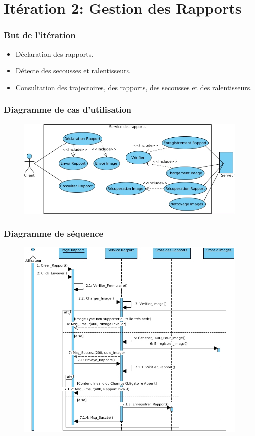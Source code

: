 \documentclass{beamer}
\begin{document}
\section{Itération 2: Gestion des Rapports}
\begin{frame}
    \frametitle{But de l'itération}
    \begin{itemize}
        \item<1-> Déclaration des rapports.
        \item<2-> Détecte des secousses et ralentisseurs.
        \item<3-> Consultation des trajectoires, des rapports, des secousses et des ralentisseurs.
    \end{itemize}
\end{frame}
\begin{frame}
    \frametitle{Diagramme de cas d'utilisation}
    \begin{figure}
        \includegraphics[width=\textwidth]{./diagrams/sprint2-webservices-report-usecase}
    \end{figure}
\end{frame}
\begin{frame}
    \frametitle{Diagramme de séquence}
    \begin{figure}
        \includegraphics[width=.8\textwidth]{./diagrams/sprint2-webservices-report-post-sequence}
    \end{figure}
\end{frame}
\end{document}
